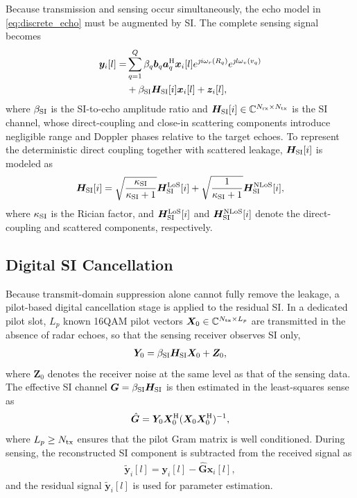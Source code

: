 \documentclass[conference]{IEEEtran}
\begin{document}
Because transmission and sensing occur simultaneously, the echo model in \eqref{eq:discrete_echo} must be augmented by SI. The complete sensing signal becomes
\begin{align}
\bm{y}_i[l]=&\sum_{q=1}^{Q}\beta_q\bm{b}_q\bm{a}_q^{\rm H}\bm{x}_i[l]
e^{\jmath i\omega_r(R_q)}e^{\jmath l\omega_v(v_q)} \\
&+\beta_{\rm SI}\bm{H}_{\rm SI}[i]\bm{x}_i[l]+\bm{z}_i[l],
\label{eq:si_model}
\end{align}
where $\beta_{\rm SI}$ is the SI-to-echo amplitude ratio and $\bm{H}_{\rm SI}[i]\in\mathbb{C}^{N_{\rm rx}\times N_{\rm tx}}$ is the SI channel, whose direct-coupling and close-in scattering components introduce negligible range and Doppler phases relative to the target echoes. To represent the deterministic direct coupling together with scattered leakage, $\bm{H}_{\rm SI}[i]$ is modeled as
\begin{align}
    \bm{H}_{\rm SI}[i]=
    \sqrt{\frac{\kappa_{\rm SI}}{\kappa_{\rm SI}+1}}\bm{H}_{\rm SI}^{\rm LoS}[i]
    +\sqrt{\frac{1}{\kappa_{\rm SI}+1}}\bm{H}_{\rm SI}^{\rm NLoS}[i],
    \label{eq:rician_si}
\end{align}
where $\kappa_{\rm SI}$ is the Rician factor, and $\bm{H}_{\rm SI}^{\rm LoS}[i]$ and $\bm{H}_{\rm SI}^{\rm NLoS}[i]$ denote the direct-coupling and scattered components, respectively.

\subsection{Digital SI Cancellation}\label{sec:sic}
Because transmit-domain suppression alone cannot fully remove the leakage, a pilot-based digital cancellation stage is applied to the residual SI. In a dedicated pilot slot, $L_p$ known 16QAM pilot vectors $\bm{X}_0\in\mathbb{C}^{N_{\rm tx}\times L_p}$ are transmitted in the absence of radar echoes, so that the sensing receiver observes SI only,
\begin{align}
    \bm{Y}_0=\beta_{\rm SI}\bm{H}_{\rm SI}\bm{X}_0+\bm{Z}_0,
    \label{eq:sic_pilot}
\end{align}
where $\bm{Z}_0$ denotes the receiver noise at the same level as that of the sensing data. The effective SI channel $\bm{G}=\beta_{\rm SI}\bm{H}_{\rm SI}$ is then estimated in the least-squares sense as
\begin{align}
    \hat{\bm{G}}=\bm{Y}_0\bm{X}_0^{\rm H}(\bm{X}_0\bm{X}_0^{\rm H})^{-1},
    \label{eq:sic_ls}
\end{align}
where $L_p\ge N_{\rm tx}$ ensures that the pilot Gram matrix is well conditioned. During sensing, the reconstructed SI component is subtracted from the received signal as
\begin{align}
    \tilde{\bm{y}}_i[l]=\bm{y}_i[l]-\hat{\bm{G}}\bm{x}_i[l],
    \label{eq:sic_subtraction}
\end{align}
and the residual signal $\tilde{\bm{y}}_i[l]$ is used for parameter estimation.
\end{document}
